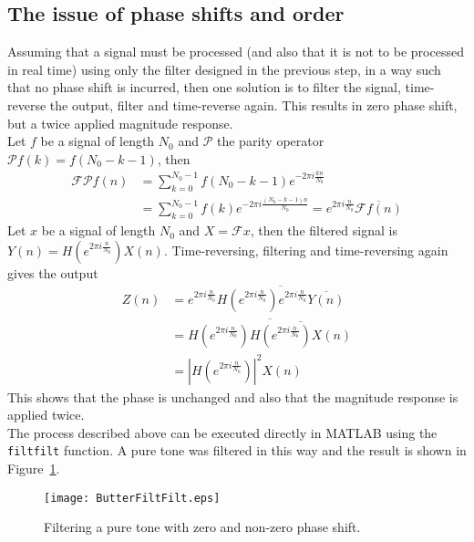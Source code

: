 \newpage
\subsection{The issue of phase shifts and order}
Assuming that a signal must be processed (and also that it is not to be processed in real time) using only the filter designed in the previous step, in a way such that no phase shift is incurred, then one solution is to filter the signal, time-reverse the output, filter and time-reverse again. This results in zero phase shift, but a twice applied magnitude response. \\

\noindent Let $f$ be a signal of length $N_0$ and $\mathcal{P}$ the parity operator $\mathcal{P}f(k)=f(N_0-k-1)$, then
\begin{align*}
\mathcal{F}\mathcal{P}f(n) 
&= \sum^{N_0-1}_{k=0} f(N_0-k-1) e^{-2\pi i\frac{kn}{N_0}} \\
&= \sum^{N_0-1}_{k=0} f(k) e^{-2\pi i \frac{(N_0-k-1)n}{N_0}} = e^{2\pi i \frac{n}{N_0}} \overline{\mathcal{F}f(n)}
\end{align*}
Let $x$ be a signal of length $N_0$ and $X=\mathcal{F}x$, then the filtered signal is $Y(n) = H(e^{2\pi i \frac{n}{N_0}})X(n)$. Time-reversing, filtering and time-reversing again gives the output
\begin{align*}
Z(n) &= e^{2\pi i \frac{n}{N_0}}\overline{H(e^{2\pi i \frac{n}{N_0}})e^{2\pi i \frac{n}{N_0}}\overline{Y(n)}} \\
 &= \overline{H(e^{2\pi i \frac{n}{N_0}})\overline{H(e^{2\pi i \frac{n}{N_0}})X(n)}} \\ 
 &= |H(e^{2\pi i \frac{n}{N_0}})|^2 X(n)
\end{align*}
This shows that the phase is unchanged and also that the magnitude response is applied twice.\\

\noindent The process described above can be executed directly in MATLAB using the \texttt{filtfilt} function. A pure tone was filtered in this way and the result is shown in Figure~\ref{fig:ButterFiltFilt}.

\begin{figure}[H]
\center
\texttt{[image: ButterFiltFilt.eps]}
\caption{Filtering a pure tone with zero and non-zero phase shift.}
\label{fig:ButterFiltFilt}
\end{figure}


